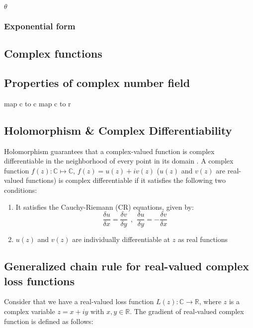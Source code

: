 $\theta$





\subsubsection{Exponential form}
\subsection{Complex functions}


\subsection{Properties of complex number field}
map c to c
map c to r



\subsection{Holomorphism \& Complex Differentiability}

Holomorphism guarantees that a complex-valued function is complex differentiable in the neighborhood of every point in its domain \cite{trabelsi2018deep}.
A complex function $f(z): \mathbb{C} \mapsto \mathbb{C}$, $f(z)= u(z) + iv(z)$ ($u(z)$ and $v(z)$ are real-valued functions) is complex differentiable if it satisfies the following two conditions:
\begin{enumerate}

	\item It satisfies the Cauchy-Riemann (CR) equations, given by:
\begin{equation}\label{eq:compdiff}
\frac{\delta u}{\delta x} = \frac{\delta v}{\delta y} ~~,~~ \frac{\delta u}{\delta y} = - \frac{\delta v}{\delta x} 
\end{equation}
	\item $u(z)$ and $v(z)$ are individually differentiable at $z$ as real functions	
\end{enumerate} 

\subsection{Generalized chain rule for real-valued complex loss  functions}\label{cchainrule}
Consider that we have a real-valued loss function $L(z): \mathbb{C}\rightarrow\mathbb{R}$, where $z$ is a complex variable $z=x+iy$ with $x,y \in \mathbb{R}$. The gradient of real-valued complex function is defined as follows:
 
